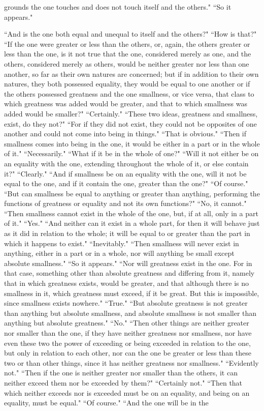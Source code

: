 \documentclass[letterpaper,12pt]{article}
\newcommand{\stephpag}[1]{\marginnote{\small\itshape\fontfamily{ppl}\selectfont #1}}
\begin{document}
grounds the one touches and does not touch itself and the others." ``So it appears."

``And is the one both equal and unequal to itself and the others?" ``How is that?" ``If the one were greater or less than the others, \stephpag{e} or, again, the others greater or less than the one, is it not true that the one, considered merely as one, and the others, considered merely as others, would be neither greater nor less than one another, so far as their own natures are concerned; but if in addition to their own natures, they both possessed equality, they would be equal to one another or if the others possessed greatness and the one smallness, or vice versa, that class to which greatness was added would be greater, and that to which smallness was added would be smaller?" ``Certainly." ``These two ideas, greatness and smallness, exist, do they not?" ``For if they did not exist, they could not be opposites of one another and could not come into being in things." ``That is obvious." \stephpag{150 a} ``Then if smallness comes into being in the one, it would be either in a part or in the whole of it." ``Necessarily." ``What if it be in the whole of one?" ``Will it not either be on an equality with the one, extending throughout the whole of it, or else contain it?" ``Clearly." ``And if smallness be on an equality with the one, will it not be equal to the one, and if it contain the one, greater than the one?" ``Of course." ``But can smallness be equal to anything or greater than anything, performing the functions of greatness or equality and not its own functions?" \stephpag{b} ``No, it cannot." ``Then smallness cannot exist in the whole of the one, but, if at all, only in a part of it." ``Yes." ``And neither can it exist in a whole part, for then it will behave just as it did in relation to the whole; it will be equal to or greater than the part in which it happens to exist." ``Inevitably." ``Then smallness will never exist in anything, either in a part or in a whole, nor will anything be small except absolute smallness." ``So it appears." ``Nor will greatness exist in the one. \stephpag{c} For in that case, something other than absolute greatness and differing from it, namely that in which greatness exists, would be greater, and that although there is no smallness in it, which greatness must exceed, if it be great. But this is impossible, since smallness exists nowhere." ``True." ``But absolute greatness is not greater than anything but absolute smallness, and absolute smallness is not smaller than anything but absolute greatness." ``No." ``Then other things are neither greater nor smaller than the one, if they have neither greatness nor smallness, \stephpag{d} nor have even these two the power of exceeding or being exceeded in relation to the one, but only in relation to each other, nor can the one be greater or less than these two or than other things, since it has neither greatness nor smallness." ``Evidently not." ``Then if the one is neither greater nor smaller than the others, it can neither exceed them nor be exceeded by them?" ``Certainly not." ``Then that which neither exceeds nor is exceeded must be on an equality, and being on an equality, must be equal." ``Of course." \stephpag{e} ``And the one will be in the 
\end{document}
